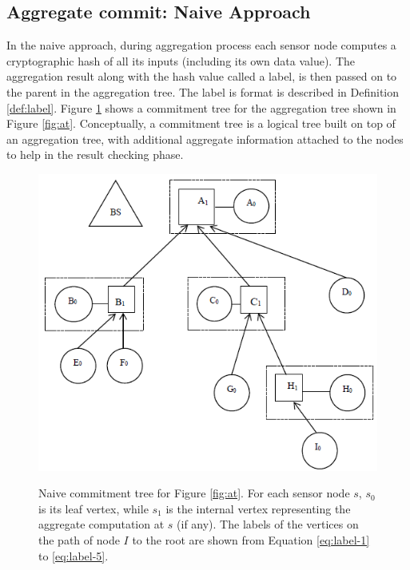 		\subsection{Aggregate commit: Naive Approach}
			\label{sub:aggregate_commit_naive_approach}
			In the naive approach, during aggregation process each sensor node computes a cryptographic hash of all its inputs (including its own data value).
			The aggregation result along with the hash value called a label, is then passed on to the parent in the aggregation tree.
			The label is format is described in Definition \ref{def:label}.
			Figure \ref{fig:naive-commitment-tree} shows a commitment tree for the aggregation tree shown in Figure \ref{fig:at}.
			Conceptually, a commitment tree is a logical tree built on top of an aggregation tree, with additional aggregate information attached to the nodes to help in the result checking phase.
			\begin{figure}[h!]
				\centering
				\includegraphics[scale = 1]{images/naive-commitment-tree.png}\\
				\caption{Naive commitment tree for Figure \ref{fig:at}.
				For each sensor node $s$, $s_{0}$ is its leaf vertex, while $s_{1}$ is the internal vertex representing the aggregate computation at $s$ (if any).
				The labels of the vertices on the path of node $I$ to the root are shown from Equation \ref{eq:label-1} to \ref{eq:label-5}.}
				\label{fig:naive-commitment-tree}
			\end{figure}

